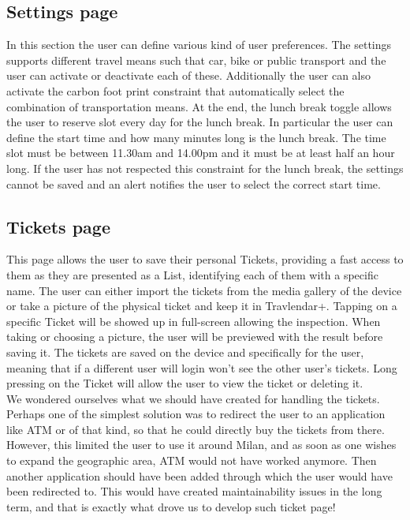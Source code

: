 \subsection*{Settings page}
In this section the user can define various kind of user preferences. The settings supports different travel means such that car, bike or public transport and the user can activate or deactivate each of these. Additionally the user can also activate the carbon foot print constraint that automatically select the combination of transportation means. At the end, the lunch break toggle allows the user to reserve slot every day for the lunch break. In particular the user can define the start time and how many minutes long is the lunch break. The time slot must be between 11.30am and 14.00pm and it must be at least half an hour long. If the user has not respected this constraint for the lunch break, the settings cannot be saved and an alert notifies the user to select the correct start time.

\subsection*{Tickets page}
This page allows the user to save their personal Tickets, providing a fast access to them as they are presented as a List, identifying each of them with a specific name. The user can either import the tickets from the media gallery of the device or take a picture of the physical ticket and keep it in Travlendar+. Tapping on a specific Ticket will be showed up in full-screen allowing the inspection. When taking or choosing a picture, the user will be previewed with the result before saving it.  The tickets are saved on the device and specifically for the user, meaning that if a different user will login won't see the other user's tickets.
Long pressing on the Ticket will allow the user to view the ticket or deleting it. \\

We wondered ourselves what we should have created for handling the tickets. Perhaps one of the simplest solution was to redirect the user to an application like ATM or of that kind, so that he could directly buy the tickets from there. However, this limited the user to use it around Milan, and as soon as one wishes to expand the geographic area, ATM would not have worked anymore. Then another application should have been added through which the user would have been redirected to. This would have created maintainability issues in the long term, and that is exactly what drove us to develop such ticket page!

